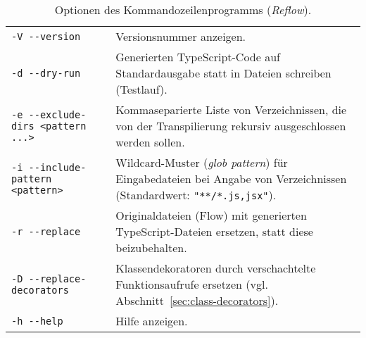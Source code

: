 \begin{table}[tbh]
  \small
  \begin{tabu} to 
    \midrule
     &  \\
    \midrule
    \medskip
    \texttt{-V -{}-version} & Versionsnummer anzeigen. \\
    \medskip
    \texttt{-d -{}-dry-run} & Generierten TypeScript-Code auf Standardausgabe statt in Dateien schreiben (Testlauf).\\
    \medskip
    \texttt{-e -{}-exclude-dirs <pattern ...>} & Kommaseparierte Liste von Verzeichnissen, die von der Transpilierung rekursiv ausgeschlossen werden sollen. \\
    \medskip
    \texttt{-i -{}-include-pattern <pattern>} & Wildcard-Muster (\textit{glob pattern}) für Eingabedateien bei Angabe von Verzeichnissen (Standardwert: \texttt{"**/*.{js,jsx}"}). \\
    \medskip
    \texttt{-r -{}-replace} & Originaldateien (Flow) mit generierten TypeScript-Dateien ersetzen, statt diese beizubehalten. \\
    \medskip
    \texttt{-D -{}-replace-decorators} & Klassendekoratoren durch verschachtelte Funktionsaufrufe ersetzen (vgl. Abschnitt~\ref{sec:class-decorators}). \\
    \medskip
    \texttt{-h -{}-help} & Hilfe anzeigen. \\
    \midrule
  \end{tabu}
  \caption{Optionen des Kommandozeilenprogramms (\textit{Reflow}).}
  \label{tab:cli-options}
\end{table}
